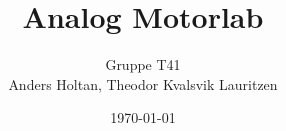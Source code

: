 \documentclass[11pt, a4paper, twocolumn, norsk]{article} %
\begin{document}
\title{Analog Motorlab}
\author{Gruppe T41\\
        Anders Holtan, Theodor Kvalsvik Lauritzen}
\date{\today}


\maketitle









{}
\printbibliography{}
\label{sec:bibliography}
\end{document}
